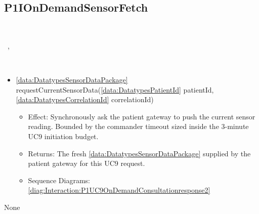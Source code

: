  \subsection{P1IOnDemandSensorFetch}\label{int:InterfacesP1IOnDemandSensorFetch}
    \begin{description}
      \item[Provided by:] \iconcomponent{}~
      \item[Required by:] \iconcomponent{}~, \iconcomponent{}~ 
      \item[Operations:] ~
    \begin{itemize}[noitemsep,nolistsep,leftmargin=-.25cm]
      \item \textsf{\ref{data:DatatypesSensorDataPackage} requestCurrentSensorData(\ref{data:DatatypesPatientId} patientId, \ref{data:DatatypesCorrelationId} correlationId)}
        \begin{itemize}[noitemsep,nolistsep]
           \item Effect: Synchronously ask the patient gateway to push the current sensor reading. Bounded by the commander timeout sized inside the 3-minute UC9 initiation budget. 
           \item Returns: The fresh \ref{data:DatatypesSensorDataPackage} supplied by the patient gateway for this UC9 request.
           \item Sequence Diagrams: \cref{diag:Interaction:P1UC9OnDemandConsultationresponse2}
        \end{itemize}
    \end{itemize}
      \item[Diagrams:] None
    \end{description}

